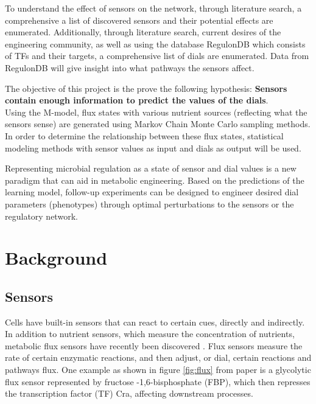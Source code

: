 \documentclass[12pt,chapterheads]{ucsd}
\begin{document}
To understand the effect of sensors on the network, through literature search, a comprehensive a list of discovered sensors  and their potential effects are enumerated. Additionally, through literature search, current desires of the engineering community, as well as using the database RegulonDB \cite{doi:10.1093/nar/gkv1156} which consists of TFs and their targets, a comprehensive list of dials are enumerated. Data from RegulonDB will give insight into what pathways the sensors affect.

The objective of this project is the prove the following hypothesis:
\textbf{Sensors contain enough information to predict the values of the dials}.\\
Using the M-model, flux states with various nutrient sources (reflecting what the sensors sense) are generated using Markov Chain Monte Carlo sampling methods. In order to determine the relationship between these flux states, statistical modeling methods with sensor values as input and dials as output will be used. 

Representing microbial regulation as a state of sensor and dial values is a new paradigm that can aid in metabolic engineering. Based on the predictions of the learning model, follow-up experiments can be designed to engineer desired dial parameters (phenotypes) through optimal perturbations to the sensors or the regulatory network.


\chapter{Background}

\section{Sensors}
Cells have built-in sensors that can react to certain cues, directly and indirectly. In addition to nutrient sensors, which measure the concentration of nutrients, metabolic flux sensors have recently been discovered \cite{Kochanowski1130}. Flux sensors measure the rate of certain enzymatic reactions, and then adjust, or dial, certain reactions and pathways flux. One example as shown in figure \ref{fig:flux} from \cite{Kochanowski1130} paper is a glycolytic flux sensor represented by fructose -1,6-bisphosphate (FBP), which then represses the transcription factor (TF) Cra, affecting downstream processes. 
\end{document}
